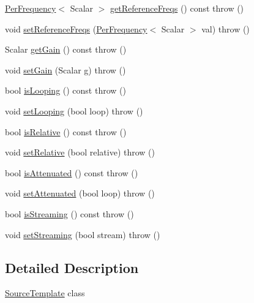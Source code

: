 \begin{DoxyCompactItemize}
\item 
\hyperlink{structAudio_1_1PerFrequency}{Per\+Frequency}$<$ Scalar $>$ \hyperlink{classAudio_1_1SourceTemplate_abe3c6d8a236dddd50ed03cce50448e05}{get\+Reference\+Freqs} () const   throw ()
\item 
void \hyperlink{classAudio_1_1SourceTemplate_a908c46f1c25c32246a300d30165e387f}{set\+Reference\+Freqs} (\hyperlink{structAudio_1_1PerFrequency}{Per\+Frequency}$<$ Scalar $>$ val)  throw ()
\item 
Scalar \hyperlink{classAudio_1_1SourceTemplate_ac8eadf0c4ab034dfe327b7fe963e805f}{get\+Gain} () const   throw ()
\item 
void \hyperlink{classAudio_1_1SourceTemplate_a4b33145dd0795b7c838453ec7808383b}{set\+Gain} (Scalar g)  throw ()
\item 
bool \hyperlink{classAudio_1_1SourceTemplate_a40525714198401f362e36d1fd97e9ae8}{is\+Looping} () const   throw ()
\item 
void \hyperlink{classAudio_1_1SourceTemplate_a87ec2b4321b72fae628850dab4210be1}{set\+Looping} (bool loop)  throw ()
\item 
bool \hyperlink{classAudio_1_1SourceTemplate_a7f485fd65f56404c7c2b332c7339722a}{is\+Relative} () const   throw ()
\item 
void \hyperlink{classAudio_1_1SourceTemplate_af5c0a2582db1284321fd7e400cc8bbe9}{set\+Relative} (bool relative)  throw ()
\item 
bool \hyperlink{classAudio_1_1SourceTemplate_ae998cfbbd58fe8682eeeb6737f23f116}{is\+Attenuated} () const   throw ()
\item 
void \hyperlink{classAudio_1_1SourceTemplate_a34dcb3269cbb9c12f349bc185bd8040e}{set\+Attenuated} (bool loop)  throw ()
\item 
bool \hyperlink{classAudio_1_1SourceTemplate_a80fc12341bd463446441b58fadf0c655}{is\+Streaming} () const   throw ()
\item 
void \hyperlink{classAudio_1_1SourceTemplate_ac7363bd8522adcb2ea04acb941cfbde5}{set\+Streaming} (bool stream)  throw ()
\end{DoxyCompactItemize}


\subsection{Detailed Description}
\hyperlink{classAudio_1_1SourceTemplate}{Source\+Template} class

